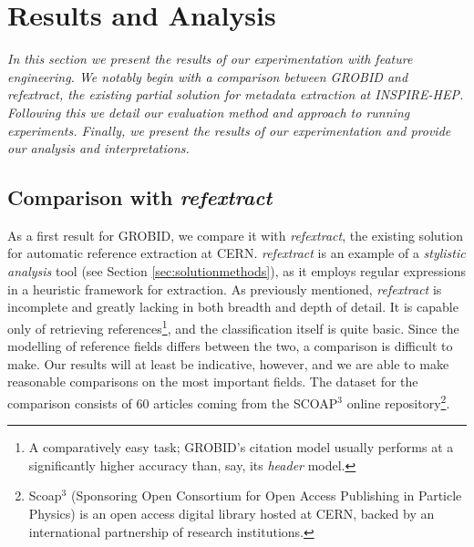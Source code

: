 
\chapter{Results and Analysis} %

\label{Chapter5} %


\emph{In this section we present the results of our experimentation with feature engineering. We notably begin with a comparison between GROBID and refextract, the existing partial solution for metadata extraction at INSPIRE-HEP. Following this we detail our evaluation method and approach to running experiments. Finally, we present the results of our experimentation and provide our analysis and interpretations.}

\section{Comparison with \emph{refextract}}

As a first result for GROBID, we compare it with \emph{refextract}, the existing solution for automatic reference extraction at CERN. \emph{refextract} is an example of a \emph{stylistic analysis} tool (see Section \ref{sec:solutionmethods}), as it employs regular expressions in a heuristic framework for extraction. As previously mentioned, \emph{refextract} is incomplete and greatly lacking in both breadth and depth of detail. It is capable only of retrieving references\footnote{A comparatively easy task; GROBID's citation model usually performs at a significantly higher accuracy than, say, its \emph{header} model.}, and the classification itself is quite basic. Since the modelling of reference fields differs between the two, a comparison is difficult to make. Our results will at least be indicative, however, and we are able to make reasonable comparisons on the most important fields. The dataset for the comparison consists of 60 articles coming from the SCOAP$^3$ online repository\footnote{Scoap$^3$ (Sponsoring Open Consortium for Open Access Publishing in Particle Physics) is an open access digital library hosted at CERN, backed by an international partnership of research institutions.}.

